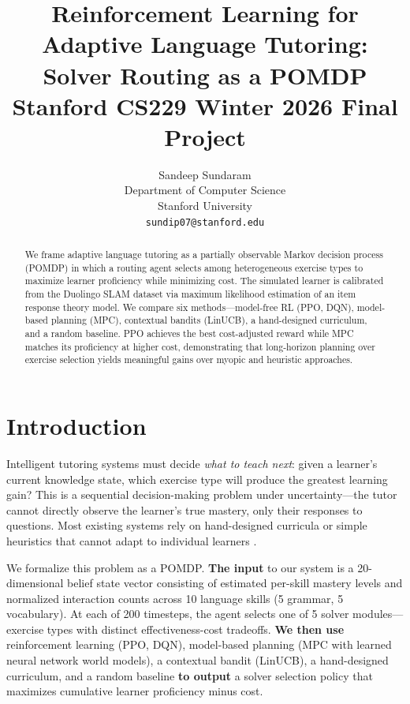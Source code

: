 \documentclass{article}
\title{
  Reinforcement Learning for Adaptive Language Tutoring:\\Solver Routing as a POMDP \\
  \vspace{1em}
  \small{\normalfont Stanford CS229 Winter 2026 Final Project}
}
\author{
  Sandeep Sundaram \\
  Department of Computer Science \\
  Stanford University \\
  \texttt{sundip07@stanford.edu} \\
}
\begin{document}
\maketitle

\begin{abstract}
We frame adaptive language tutoring as a partially observable Markov decision process (POMDP) in which a routing agent selects among heterogeneous exercise types to maximize learner proficiency while minimizing cost. The simulated learner is calibrated from the Duolingo SLAM dataset via maximum likelihood estimation of an item response theory model. We compare six methods---model-free RL (PPO, DQN), model-based planning (MPC), contextual bandits (LinUCB), a hand-designed curriculum, and a random baseline. PPO achieves the best cost-adjusted reward while MPC matches its proficiency at higher cost, demonstrating that long-horizon planning over exercise selection yields meaningful gains over myopic and heuristic approaches.
\end{abstract}

\section{Introduction}

Intelligent tutoring systems must decide \emph{what to teach next}: given a learner's current knowledge state, which exercise type will produce the greatest learning gain? This is a sequential decision-making problem under uncertainty---the tutor cannot directly observe the learner's true mastery, only their responses to questions. Most existing systems rely on hand-designed curricula or simple heuristics that cannot adapt to individual learners \citep{doroudi2019tutoring}.

We formalize this problem as a POMDP. \textbf{The input} to our system is a 20-dimensional belief state vector consisting of estimated per-skill mastery levels and normalized interaction counts across 10 language skills (5 grammar, 5 vocabulary). At each of 200 timesteps, the agent selects one of 5 solver modules---exercise types with distinct effectiveness-cost tradeoffs. \textbf{We then use} reinforcement learning (PPO, DQN), model-based planning (MPC with learned neural network world models), a contextual bandit (LinUCB), a hand-designed curriculum, and a random baseline \textbf{to output} a solver selection policy that maximizes cumulative learner proficiency minus cost.
\end{document}
